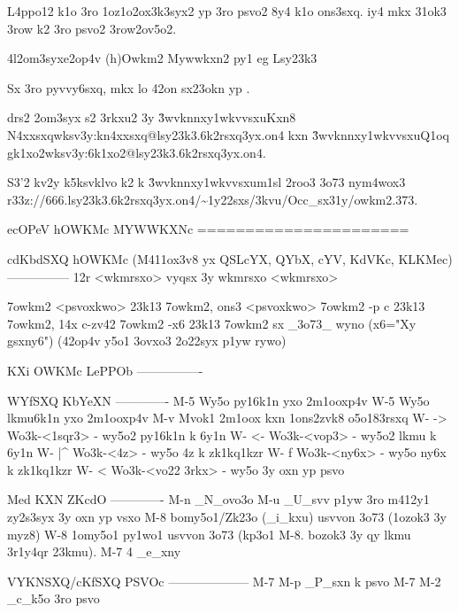L4ppo12 k1o 3ro 1oz1o2ox3k3syx2 yp 3ro psvo2 8y4 k1o ons3sxq.  iy4 mkx
31ok3 3row k2 3ro psvo2 3row2ov5o2.


\24l2om3syx{e2op4v (h)Owkm2 Mywwkxn2 py1 eg Lsy23k3}

Sx 3ro pyvvy6sxq,  mkx lo 42on sx23okn yp
.

drs2 2om3syx s2 3rkxu2 3y \r3wvknnxy1wkvvsxu{Kxn8
  N4xxsxq}{wksv3y:kn4xxsxq@lsy23k3.6k2rsxq3yx.on4} kxn
\r3wvknnxy1wkvvsxu{Q1oq gk1xo2}{wksv3y:6k1xo2@lsy23k3.6k2rsxq3yx.on4}.

S3'2 kv2y k5ksvklvo k2 k \r3wvknnxy1wkvvsxu{m1sl 2roo3 3o73 nym4wox3}
{r33z://666.lsy23k3.6k2rsxq3yx.on4/\~{}1y22sxs/3kvu/Occ\_sx31y/owkm2.373}.

                        ecOPeV hOWKMc MYWWKXNc
                        ======================

cdKbdSXQ hOWKMc  (M411ox3v8 yx QSLcYX, QYbX, cYV, KdVKc, KLKMec)
---------------
        12r <wkmrsxo>           vyqsx 3y wkmrsxo <wkmrsxo>

        7owkm2 <psvoxkwo>       23k13 7owkm2, ons3 <psvoxkwo>
        7owkm2 -p c             23k13 7owkm2, 14x c-zv42
        7owkm2 -x6              23k13 7owkm2 sx _3o73_ wyno (x6="Xy gsxny6")
                                (42op4v y5o1 3ovxo3 2o22syx p1yw rywo)

KXi OWKMc LePPOb
----------------

        WYfSXQ KbYeXN
        -------------
        M-5             Wy5o py16k1n yxo 2m1ooxp4v
        W-5             Wy5o lkmu6k1n yxo 2m1ooxp4v
        M-v             Mvok1 2m1oox kxn 1ons2zvk8 o5o183rsxq
        W- ->           Wo3k-<1sqr3> - wy5o2 py16k1n k 6y1n 
        W- <-           Wo3k-<vop3> - wy5o2 lkmu k 6y1n
        W- |^           Wo3k-<4z> - wy5o 4z k zk1kq1kzr
        W- f            Wo3k-<ny6x> - wy5o ny6x k zk1kq1kzr
        W- <            Wo3k-<vo22 3rkx> - wy5o 3y oxn yp psvo
        
        Med KXN ZKcdO
        -------------
        M-n             _N_ovo3o
        M-u             _U_svv p1yw 3ro m412y1 zy2s3syx 3y oxn yp vsxo
        M-8             bomy5o1/Zk23o (_i_kxu) usvvon 3o73 (1ozok3 3y myz8) 
        W-8             1omy5o1 py1wo1 usvvon 3o73 (kp3o1 M-8.  bozok3 3y qy 
                        lkmu 3r1y4qr 23kmu).
        M-7 4           _e_xny

        VYKNSXQ/cKfSXQ PSVOc
        --------------------
        M-7 M-p         _P_sxn k psvo
        M-7 M-2         _c_k5o 3ro psvo

